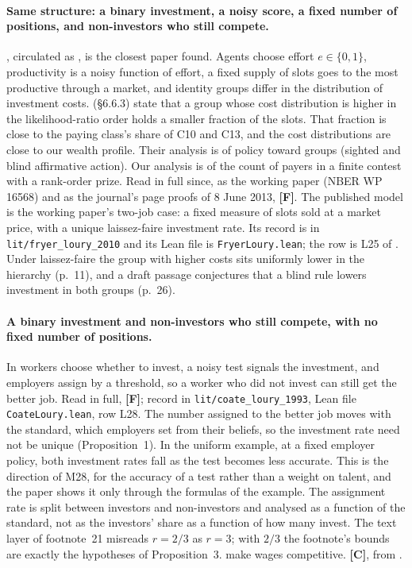 \documentclass[11pt,a4paper]{article}
\begin{document}
\paragraph{Same structure: a binary investment, a noisy score, a fixed number of
positions, and non-investors who still compete.}
\citet{FryerLoury2013}, circulated as \citet{FryerLoury2010}, is the closest
paper found. Agents choose effort $e\in\{0,1\}$, productivity is a noisy
function of effort, a fixed supply of slots goes to the most productive through
a market, and identity groups differ in the distribution of investment costs.
\citet{FangMoro2010} (\S6.6.3) state that a group whose cost distribution is
higher in the likelihood-ratio order holds a smaller fraction of the slots. That fraction is close to the paying class's
share of C10 and C13, and the cost distributions are close to our wealth
profile. Their analysis is of policy toward groups (sighted and blind
affirmative action). Our analysis is of the count of payers in a finite contest
with a rank-order prize. Read in full since, as the working paper (NBER WP
16568) and as the journal's page proofs of 8 June 2013, \textbf{[F]}. The
published model is the working paper's two-job case: a fixed measure of slots
sold at a market price, with a unique laissez-faire investment rate. Its record
is in \texttt{lit/fryer\_loury\_2010} and its Lean file is
\texttt{FryerLoury.lean}; the row is L25 of . Under laissez-faire the group with
higher costs sits uniformly lower in the hierarchy (p.~11), and a draft
passage conjectures that a blind rule lowers investment in both groups
(p.~26).

\paragraph{A binary investment and non-investors who still compete, with no fixed
number of positions.}
In \citet{CoateLoury1993} workers choose whether to invest, a noisy test
signals the investment, and employers assign by a threshold, so a worker who
did not invest can still get the better job. Read in full, \textbf{[F]}; record
in \texttt{lit/coate\_loury\_1993}, Lean file \texttt{CoateLoury.lean}, row L28.
The number assigned to the better job moves with the standard, which employers
set from their beliefs, so the investment rate need not be unique
(Proposition~1). In the uniform example, at a fixed employer policy, both
investment rates fall as the test becomes less accurate. This is the direction
of M28, for the accuracy of a test rather than a weight on talent, and the paper
shows it only through the formulas of the example. The assignment rate is split
between investors and non-investors and analysed as a function of the
standard, not as the investors' share as a function of how many invest. The
text layer of footnote~21 misreads $r=2/3$ as $r=3$; with $2/3$ the footnote's
bounds are exactly the hypotheses of Proposition~3. \citet{MoroNorman2003} make
wages competitive. \textbf{[C]}, from \citet{FangMoro2010}.
\end{document}
